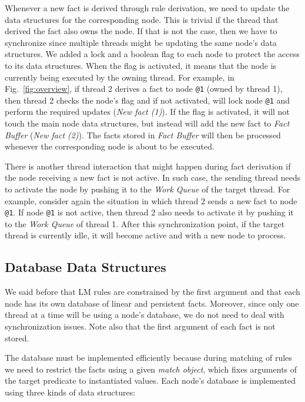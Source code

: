 Whenever a new fact is derived through rule derivation, we need to
update the data structures for the corresponding node. This is trivial
if the thread that derived the fact also owns the node. If that is not
the case, then we have to synchronize since multiple threads might be
updating the same node's data structures. We added a lock and a
boolean flag to each node to protect the access to its data
structures. When the flag is activated, it means that the node is
currently being executed by the owning thread. For example, in
Fig.~\ref{fig:overview}, if thread 2 derives a fact to
node \texttt{@1} (owned by thread 1), then thread 2 checks the node's
flag and if not activated, will lock node \texttt{@1} and perform the
required updates (\emph{New fact (1)}). If the flag is activated, it
will not touch the main node data structures, but instead will add the
new fact to \emph{Fact Buffer} (\emph{New fact (2)}). The facts stored
in \emph{Fact Buffer} will then be processed whenever the
corresponding node is about to be executed.

There is another thread interaction that might happen during fact
derivation if the node receiving a new fact is not active. In such
case, the sending thread needs to activate the node by pushing it to
the \emph{Work Queue} of the target thread. For example, consider
again the situation in which thread 2 sends a new fact to
node \texttt{@1}. If node \texttt{@1} is not active, then thread 2
also needs to activate it by pushing it to the \emph{Work Queue} of
thread 1. After this synchronization point, if the target thread is
currently idle, it will become active and with a new node to process.


\subsection{Database Data Structures}
\label{sec:database}

We said before that LM rules are constrained by the first argument and
that each node has its own database of linear and persistent
facts. Moreover, since only one thread at a time will be using a
node's database, we do not need to deal with synchronization
issues. Note also that the first argument of each fact is not stored.

The database must be implemented efficiently because during matching
of rules we need to restrict the facts using a given \emph{match
object}, which fixes arguments of the target predicate to instantiated
values. Each node's database is implemented using three kinds of data
structures:

